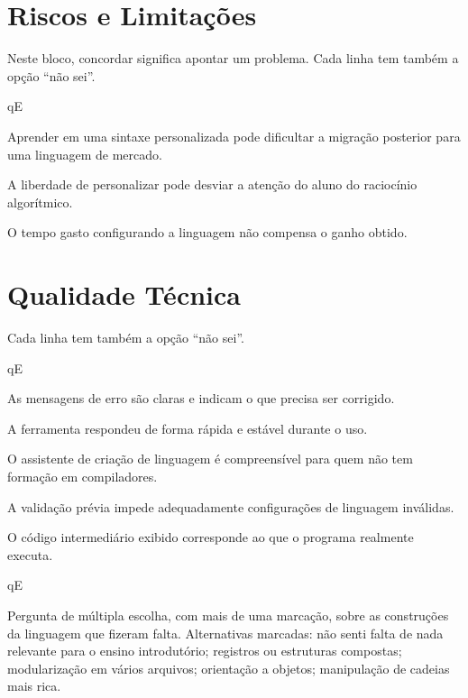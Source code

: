 \section{Riscos e Limitações}

Neste bloco, concordar significa apontar um problema. Cada linha tem também a opção ``não sei''.


\begin{questoes}{qE}
    \item\label{qE:riscos-ini} Aprender em uma sintaxe personalizada pode dificultar a migração posterior para uma linguagem de mercado.
    \item A liberdade de personalizar pode desviar a atenção do aluno do raciocínio algorítmico.
    \item\label{qE:riscos-fim} O tempo gasto configurando a linguagem não compensa o ganho obtido.
\end{questoes}


\section{Qualidade Técnica}

Cada linha tem também a opção ``não sei''.


\begin{questoes}{qE}
    \item\label{qE:qual-ini} As mensagens de erro são claras e indicam o que precisa ser corrigido.
    \item A ferramenta respondeu de forma rápida e estável durante o uso.
    \item O assistente de criação de linguagem é compreensível para quem não tem formação em compiladores.
    \item A validação prévia impede adequadamente configurações de linguagem inválidas.
    \item O código intermediário exibido corresponde ao que o programa realmente executa.
\end{questoes}

\begin{questoes}{qE}
    \item\label{qE:qual-fim} Pergunta de múltipla escolha, com mais de uma marcação, sobre as construções da linguagem que fizeram falta. Alternativas marcadas: não senti falta de nada relevante para o ensino introdutório; registros ou estruturas compostas; modularização em vários arquivos; orientação a objetos; manipulação de cadeias mais rica.
\end{questoes}


